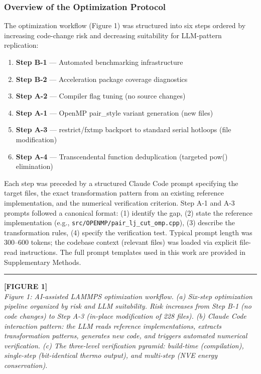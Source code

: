 \documentclass[
  11pt,
]{article}
\providecommand{\tightlist}{%
  \setlength{\itemsep}{0pt}\setlength{\parskip}{0pt}}
\providecommand{\tightlist}{%
  \setlength{\itemsep}{0pt}\setlength{\parskip}{0pt}}
\begin{document}
\subsubsection{Overview of the Optimization
Protocol}\label{overview-of-the-optimization-protocol}

The optimization workflow (Figure 1) was structured into six steps
ordered by increasing code-change risk and decreasing suitability for
LLM-pattern replication:

\begin{enumerate}
\def\labelenumi{\arabic{enumi}.}
\tightlist
\item
  \textbf{Step B-1} --- Automated benchmarking infrastructure
\item
  \textbf{Step B-2} --- Acceleration package coverage diagnostics
\item
  \textbf{Step A-2} --- Compiler flag tuning (no source changes)
\item
  \textbf{Step A-1} --- OpenMP pair\_style variant generation (new
  files)
\item
  \textbf{Step A-3} --- restrict/fxtmp backport to standard serial
  hotloops (file modification)
\item
  \textbf{Step A-4} --- Transcendental function deduplication (targeted
  pow() elimination)
\end{enumerate}

Each step was preceded by a structured Claude Code prompt specifying the
target files, the exact transformation pattern from an existing
reference implementation, and the numerical verification criterion. Step
A-1 and A-3 prompts followed a canonical format: (1) identify the gap,
(2) state the reference implementation (e.g.,
\texttt{src/OPENMP/pair\_lj\_cut\_omp.cpp}), (3) describe the
transformation rules, (4) specify the verification test. Typical prompt
length was 300--600 tokens; the codebase context (relevant files) was
loaded via explicit file-read instructions. The full prompt templates
used in this work are provided in Supplementary Methods.

\begin{center}\rule{0.5\linewidth}{0.5pt}\end{center}

\textbf{{[}FIGURE 1{]}}\\
\emph{Figure 1: AI-assisted LAMMPS optimization workflow. (a) Six-step
optimization pipeline organized by risk and LLM suitability. Risk
increases from Step B-1 (no code changes) to Step A-3 (in-place
modification of 228 files). (b) Claude Code interaction pattern: the LLM
reads reference implementations, extracts transformation patterns,
generates new code, and triggers automated numerical verification. (c)
The three-level verification pyramid: build-time (compilation),
single-step (bit-identical thermo output), and multi-step (NVE energy
conservation).}
\end{document}
